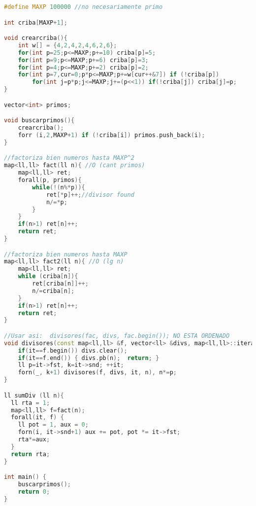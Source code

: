 \begin{lstlisting}[language=C++]
#define MAXP 100000	//no necesariamente primo

int criba[MAXP+1];

void crearcriba(){
	int w[] = {4,2,4,2,4,6,2,6};
	for(int p=25;p<=MAXP;p+=10) criba[p]=5;
	for(int p=9;p<=MAXP;p+=6) criba[p]=3; 
	for(int p=4;p<=MAXP;p+=2) criba[p]=2;
	for(int p=7,cur=0;p*p<=MAXP;p+=w[cur++&7]) if (!criba[p]) 
		for(int j=p*p;j<=MAXP;j+=(p<<1)) if(!criba[j]) criba[j]=p;
}

vector<int> primos;

void buscarprimos(){
	crearcriba();
	forr (i,2,MAXP+1) if (!criba[i]) primos.push_back(i);
}

//factoriza bien numeros hasta MAXP^2
map<ll,ll> fact(ll n){ //O (cant primos)
	map<ll,ll> ret;
	forall(p, primos){
		while(!(n%*p)){
			ret[*p]++;//divisor found
			n/=*p;
		}
	}
	if(n>1) ret[n]++;
	return ret;
}

//factoriza bien numeros hasta MAXP
map<ll,ll> fact2(ll n){ //O (lg n)
	map<ll,ll> ret;
	while (criba[n]){
		ret[criba[n]]++;
		n/=criba[n];
	}
	if(n>1) ret[n]++;
	return ret;
}

//Usar asi:  divisores(fac, divs, fac.begin()); NO ESTA ORDENADO
void divisores(const map<ll,ll> &f, vector<ll> &divs, map<ll,ll>::iterator it, ll n=1){
    if(it==f.begin()) divs.clear();
    if(it==f.end()) { divs.pb(n);  return; }
    ll p=it->fst, k=it->snd; ++it;
    forn(_, k+1) divisores(f, divs, it, n), n*=p;
}

ll sumDiv (ll n){
  ll rta = 1;
  map<ll,ll> f=fact(n);
  forall(it, f) {
	ll pot = 1, aux = 0;  
	forn(i, it->snd+1) aux += pot, pot *= it->fst;
	rta*=aux;
  } 
  return rta;
}

int main() {
	buscarprimos();
	return 0;
}
\end{lstlisting}